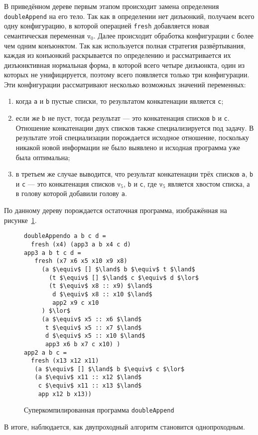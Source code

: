 В приведённом дереве первым этапом происходит замена определения \lstinline{doubleAppend}
на его тело. Так как в определении нет дизъюнкий, получаем всего одну конфигурацию,
в которой операцией \lstinline{fresh} добавляется новая семантическая переменная $\texttt{v}_0$.
Далее происходит обработка конфигурации с более чем одним конъюнктом. Так как используется
полная стратегия развёртывания, каждая из конъюнкий раскрывается по определению и
рассматривается их дизъюнктивная нормальная форма, в которой всего четыре дизъюнкта,
один из которых не унифицируется, поэтому всего появляется только три конфигурации.
Эти конфигурации рассматривают несколько возможных значений переменных:
\begin{enumerate}
\item когда \lstinline{a} и \lstinline{b} пустые списки, то результатом конкатенации
является \lstinline{c};
\item если же \lstinline{b} не пуст, тогда результат --- это конкатенация списков \lstinline{b} и \lstinline{c}.
      Отношение конкатенации двух списков также специализируется под задачу.
      В результате этой специализации порождается исходное отношение, поскольку
      никакой новой информации не было выявлено и исходная программа уже была оптимальна;
\item в третьем же случае выводится, что результат конкатенации трёх списков
      \lstinline{a}, \lstinline{b} и \lstinline{c} --- это конкатенация
      списков $\texttt{v}_5$, \lstinline{b} и \lstinline{c}, где $\texttt{v}_5$
      является хвостом списка, а в голову которой добавили голову \lstinline{a}.
\end{enumerate}

По данному дереву порождается остаточная программа, изображённая на рисунке~\ref{fig:dappCodeOpt}.
\begin{figure}[h!]
\begin{lstlisting}
doubleAppendo a b c d =
  fresh (x4) (app3 a b x4 c d)
app3 a b t c d =
   fresh (x7 x6 x5 x10 x9 x8)
     (a $\equiv$ [] $\land$ b $\equiv$ t $\land$
       (t $\equiv$ [] $\land$ c $\equiv$ d $\lor$
       (t $\equiv$ x8 :: x9) $\land$
        d $\equiv$ x8 :: x10 $\land$
        app2 x9 c x10
     ) $\lor$
     (a $\equiv$ x5 :: x6 $\land$
      t $\equiv$ x5 :: x7 $\land$
      d $\equiv$ x5 :: x10 $\land$
      app3 x6 b x7 c x10) )
app2 a b c =
  fresh (x13 x12 x11)
   (a $\equiv$ [] $\land$ b $\equiv$ c $\lor$
   (a $\equiv$ x11 :: x12 $\land$
    c $\equiv$ x11 :: x13 $\land$
    app x12 b x13))
\end{lstlisting}
\caption{Суперкомпилированная программа \lstinline{doubleAppend}}
\label{fig:dappCodeOpt}
\end{figure}

В итоге, наблюдается, как двупроходный алгоритм становится однопроходным.
